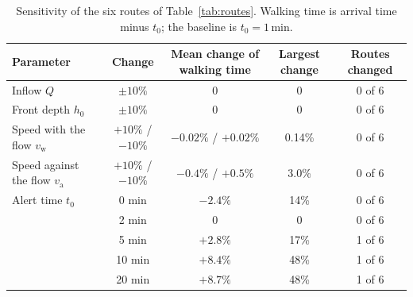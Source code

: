 \documentclass[11pt,a4paper]{article}
\theoremstyle{plain}
\theoremstyle{definition}
\theoremstyle{remark}
\newcommand{\vw}{v_{\mathrm{w}}}
\newcommand{\va}{v_{\mathrm{a}}}
\begin{document}
\begin{table}[htbp]
  \centering\small
  \begin{tabular}{@{}l c c c c@{}}
    \toprule
    Parameter & Change & Mean change of walking time & Largest change & Routes changed \\
    \midrule
    Inflow $Q$                & $\pm10\%$ & 0 & 0 & 0 of 6 \\
    Front depth $h_0$         & $\pm10\%$ & 0 & 0 & 0 of 6 \\
    Speed with the flow $\vw$ & $+10\%$ / $-10\%$ & $-0.02\%$ / $+0.02\%$ & 0.14\% & 0 of 6 \\
    Speed against the flow $\va$ & $+10\%$ / $-10\%$ & $-0.4\%$ / $+0.5\%$ & 3.0\% & 0 of 6 \\
    Alert time $t_0$          & 0 min  & $-2.4\%$ & 14\% & 0 of 6 \\
                              & 2 min  & 0        & 0    & 0 of 6 \\
                              & 5 min  & $+2.8\%$ & 17\% & 1 of 6 \\
                              & 10 min & $+8.4\%$ & 48\% & 1 of 6 \\
                              & 20 min & $+8.7\%$ & 48\% & 1 of 6 \\
    \bottomrule
  \end{tabular}
  \caption{Sensitivity of the six routes of Table~\ref{tab:routes}. Walking time is arrival time minus $t_0$; the baseline is $t_0 = 1$\,min.}
  \label{tab:sens}
\end{table}
\end{document}
